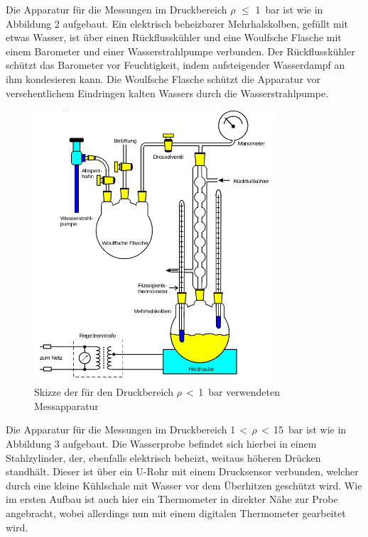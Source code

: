 \documentclass[
  parskip=half,
  bibliography=totoc,     %
  captions=tableheading,  %
  titlepage=firstiscover, %
]{scrartcl}
\begin{document}
Die Apparatur für die Messungen im Druckbereich $\rho$ $\le$ \SI{1}{\bar} ist
wie in Abbildung 2 aufgebaut.
Ein elektrisch beheizbarer Mehrhalskolben, gefüllt mit etwas Wasser, ist über
einen Rückflusskühler und eine Woulfsche Flasche mit einem Barometer und einer
Wasserstrahlpumpe verbunden. Der Rückflusskühler schützt das Barometer vor
Feuchtigkeit, indem aufsteigender Wasserdampf an ihm kondesieren kann. Die
Woulfsche Flasche schützt die Apparatur vor versehentlichem Eindringen kalten
Wassers durch die Wasserstrahlpumpe.
\begin{figure}[htb]
  \centering
  \includegraphics[width=0.8\textwidth]{Versuch1.png}
  \caption{Skizze der für den Druckbereich $\rho$\,$<$\,\SI{1}{\bar} verwendeten Messapparatur}
  \label{fig:versuch1}
\end{figure}
Die Apparatur für die Messungen im Druckbereich \num{1}\,$<$\,$\rho$\,$<$\,\SI{15}{\bar}
ist wie in Abbildung 3 aufgebaut.
Die Wasserprobe befindet sich hierbei in einem Stahlzylinder, der, ebenfalls
elektrisch beheizt, weitaus höheren Drücken standhält. Dieser ist über ein
U-Rohr mit einem Drucksensor verbunden, welcher durch eine kleine Kühlschale mit
Wasser vor dem Überhitzen geschützt wird. Wie im ersten Aufbau ist auch hier ein
Thermometer in direkter Nähe zur Probe angebracht, wobei allerdings nun mit
einem digitalen Thermometer gearbeitet wird.
\end{document}
